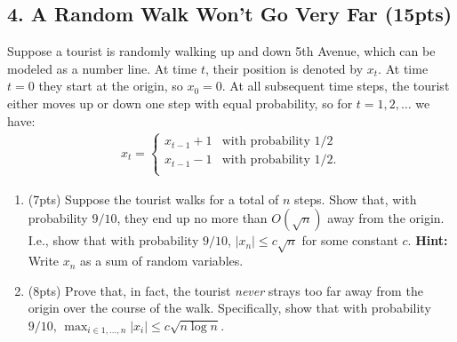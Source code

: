 \documentclass[10pt]{article}
\begin{document}
\newpage 

\subsection{4. A Random Walk Won't Go Very Far (\textbf {\small 15pts})}
Suppose a tourist is randomly walking up and down 5th Avenue, which can be modeled as a number line. At time $t$, their position is denoted by $x_t$. At time $t=0$ they start at the origin, so $x_0 = 0$. At all subsequent time steps, the tourist either moves up or down one step with equal probability, so for $t = 1, 2, \ldots$ we have:
\begin{align*}
	x_t = \begin{cases}
		x_{t-1} + 1 & \text{with probability } 1/2 \\
		x_{t-1} - 1 & \text{with probability } 1/2. \\
	\end{cases} 
\end{align*}
\begin{enumerate}[label=(\alph*)]
	\item (7pts) 
	Suppose the tourist walks for a total of $n$ steps. Show that, with probability $9/10$, they end up no more than $O(\sqrt{n})$ away from the origin. I.e., show that with probability $9/10$, $|x_n| \leq c\sqrt{n}$ for some constant $c$. \textbf{Hint:} Write $x_n$ as a sum of random variables.
	\vspace{25em}
	
	\item (8pts) Prove that, in fact, the tourist \emph{never} strays too far away from the origin over the course of the walk. Specifically, show that with probability $9/10$, $\max_{i\in 1, \ldots, n} |x_i| \leq c\sqrt{n\log n}$.
\end{enumerate}
\end{document}
